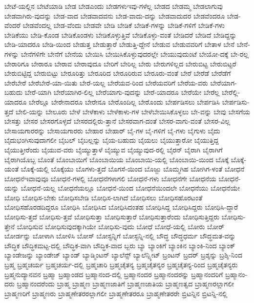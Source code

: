 {ಬೇಟೆ-ಯಲ್ಲಿನ
ಬೇಟೆಯಾಡಿ
ಬೇಡ
ಬೇಡಎಂದು
ಬೇಡಗಳುಇವು-ಗಳೆಲ್ಲ
ಬೇಡದ
ಬೇಡಮ್ಮ
ಬೇಡಲಾಗುವು
ಬೇಡವಾಗಿರು-ವುದನ್ನು
ಬೇಡ-ವಾದ
ಬೇಡವಾದವನು
ಬೇಡ-ವಾದು-ದನ್ನು
ಬೇಡವಾದುದರ
ಬೇಡವೆಂದರೂ
ಬೇಡ-ವೆಂದರೆ
ಬೇಡವೆಂದಲ್ಲ
ಬೇಡ-ವೆಂದು
ಬೇಡವೇ
ಬೇಡಿ
ಬೇಡಿಕೆ
ಬೇಡಿಕೆ-ಗಳನ್ನು
ಬೇಡಿಕೆ-ಗಳಿಗೆ
ಬೇಡಿಕೆ-ಗಳು
ಬೇಡಿಕೆಯು
ಬೇಡಿ-ಕೊಂಡ
ಬೇಡಿಕೊಂಡಳು
ಬೇಡಿಕೊಳ್ಳುತ್ತಿವೆ
ಬೇಡಿಕೊಳ್ಳು-ವಂತೆ
ಬೇಡಿದರೆ
ಬೇಡಿದೆ
ಬೇಡಿದ್ದನ್ನು
ಬೇಡಿ-ಯಾದರೂ
ಬೇಡಿ-ಯಿಂದ
ಬೇಡುತ್ತ
ಬೇಡುತ್ತಾರೆ
ಬೇಡುತ್ತಿ-ದ್ದೇನೆ
ಬೇಡುವ
ಬೇಡುವವರಿಗೆ
ಬೇತಾಳ
ಬೇನೆ
ಬೇನೆ-ಗಳನ್ನು
ಬೇನೆಗಳಿಗೇ
ಬೇನೆಗೆ
ಬೇನೆಯ
ಬೇಯಿಸಿ
ಬೇಯಿಸಿಕೊಳ್ಳುವುದರಲ್ಲೇ
ಬೇಯುವುದುಂಟೆ
ಬೇಯೋ-ದಕ್ಕೆ
ಬೇ-ರಲ್ಲ
ಬೇರಾರಿಗೂ
ಬೇರಾರೂ
ಬೇರಾವ
ಬೇರಾವುದೂ
ಬೇರಿಗೆ
ಬೇರಿಲ್ಲ
ಬೇರು
ಬೇರುಗಳಿಲ್ಲದ
ಬೇರುಬಿಟ್ಟ
ಬೇರುಬಿಟ್ಟರೆ
ಬೇರುಬಿಟ್ಟಿದ್ದ
ಬೇರುಬಿಟ್ಟು
ಬೇರೂರಿತ್ತು
ಬೇರೂರಿದ
ಬೇರೂರಿರುವ
ಬೇರೂರು-ವಂತೆ
ಬೇರೆ
ಬೇರೆಡೆ
ಬೇರೆಡೆಗೆ
ಬೇರೆಬೇರೆ
ಬೇರೆಬೇರೆ-ಯಾ-ಯಿತು
ಬೇರೆ-ಯಲ್ಲ
ಬೇರೆಯವ-ರಿಂದ
ಬೇರೆಯವರಿಗೆ
ಬೇರೆಯ-ವರು
ಬೇರೆಯಾಗ-ಬಹುದು
ಬೇರೆ-ಯಾಗಿ
ಬೇರೆಯಾಗಿರ-ಲಿಲ್ಲ
ಬೇರೆಯಾಗು-ವುದನ್ನು
ಬೇರೆ-ಯಾದರೂ
ಬೇರೆಯೇ
ಬೇರೆಲ್ಲ
ಬೇರೆಲ್ಲಿ-ಯಾದರೂ
ಬೇರೆಲ್ಲೂ
ಬೇರೇನಾದರೂ
ಬೇರೇನೂ
ಬೇರೊಂದಿಲ್ಲ
ಬೇರೊಂದು
ಬೇರ್ಪಡಿಸಲು
ಬೇರ್ಪಡಿಸಿ
ಬೇರ್ಪಡಿಸು-ತ್ತದೆ
ಬೇಲಿ-ಯನ್ನು
ಬೇಲೂರು
ಬೇಳೆ
ಬೇಳೆಕಾಳು
ಬೇಳೆಕಾಳು-ಗಳ
ಬೇಳೆಬೇಯಿಸಿಕೊಳ್ಳಲು
ಬೇ-ವನ್ನು
ಬೇವು
ಬೇಸಗೆಯ
ಬೇಸತ್ತು
ಬೇಸರ
ಬೇಸರಗೊಳ್ಳದೆ
ಬೇಸರದಲ್ಲಿರು-ತ್ತಾನೆ
ಬೇಸರವಾಗ-ದಂತೆ
ಬೇಸರ-ವಾಗು-ವಂತೆ
ಬೇಸರ-ವಿಲ್ಲ
ಬೇಸಾಯಗಾರರನ್ನು
ಬೇಸಾಯಗಾರರು
ಬೇಹಾರ
ಬೇಹಾರ್
ಬೈ-ಗಳ
ಬೈ-ಗಳಿಗೆ
ಬೈ-ಗಳು
ಬೈಗುಳು
ಬೈದು
ಬೈದುಭಂಗಿಸುವುದಾಗಲೀ
ಬೈಬಲ್
ಬೈಬಲ್ಲನ್ನು
ಬೈಯ-ಬಹುದು
ಬೈಯಲು
ಬೈಯುತ್ತಾರೋ
ಬೈಯುತ್ತಿದ್ದ
ಬೈಯುತ್ತೀರೆಂದು
ಬೈಯುವ-ವರು
ಬೈಯ್ಯುತ್ತಾಳೆ
ಬೈಯ್ಯುವ
ಬೈಯ್ಯುವುದ-ರಲ್ಲಿ
ಬೈರನ್
ಬೈರಾಗಿ
ಬೈರಾಗಿಗೆ
ಬೈರಾಗಿಯೊಬ್ಬ
ಬೊಂತೆ
ಬೊಂಬಾಯಿಗೆ
ಬೊಂಬಾಯಿಯ
ಬೊಂಬಾಯಿ-ಯಲ್ಲಿ
ಬೊಂಬಾಯಿ-ಯಿಂದ
ಬೊಕ್ಕೆ
ಬೊಕ್ಕೆ-ಯಂತೆ
ಬೊಕ್ಕೆ-ಯಲ್ಲಿ
ಬೊಕ್ಕೆಯು
ಬೊಗಳು-ತ್ತದೆ
ಬೊಗಸೆ-ಯಿಂದ
ಬೊಜ್ಜು
ಬೊಮ್ಮಗಿಹ
ಬೋಗಿಗ-ಳಂತೆ
ಬೋಧನೆ
ಬೋಧನೆಇವಾವುವೂ
ಬೋಧನೆ-ಗಳಲ್ಲಿ
ಬೋಧನೆಗಳಾಗಲಿ
ಬೋಧನೆ-ಗಳು
ಬೋಧನೆಗೇ
ಬೋಧನೆಯ
ಬೋಧನೆ-ಯನ್ನು
ಬೋಧನೆ-ಯಲ್ಲ
ಬೋಧನೆಯಲ್ಲೂ
ಬೋಧನೆ-ಯಿಂದ
ಬೋಧನೆಯಿಂದಲೇ
ಬೋಧನೆಯು
ಬೋಧನೆಯೇ
ಬೋಧಿ
ಬೋಧಿಸ-ಬೇಕು
ಬೋಧಿಸಬೇಡಿ
ಬೋಧಿಸ-ಲಾಗಿದೆ
ಬೋಧಿಸಲು
ಬೋಧಿಸಹೊರಟಂತೆ
ಬೋಧಿಸಹೊರಡದಿದ್ದರೂ
ಬೋಧಿಸಿ
ಬೋಧಿಸಿದ
ಬೋಧಿಸಿದಂತಹ
ಬೋಧಿಸಿದ್ದ
ಬೋಧಿಸಿದ್ದರು
ಬೋಧಿಸಿ-ದ್ದಾರೆ
ಬೋಧಿಸು-ತ್ತದೆ
ಬೋಧಿಸು-ತ್ತವೆ
ಬೋಧಿಸುತ್ತಾ
ಬೋಧಿಸುತ್ತಾರೆ
ಬೋಧಿಸುತ್ತಾರೆಂದು
ಬೋಧಿಸುತ್ತಿದ್ದರು
ಬೋಧಿಸು-ತ್ತೇನೆ
ಬೋಧಿಸುವ
ಬೋಧಿಸುವುದಕ್ಕಾಗಿಯೇ
ಬೋಧಿಸು-ವುದು
ಬೋಧೆ
ಬೋಧೆ-ಯಲ್ಲಿ
ಬೋರು
ಬೋರ್
ಬೋರ್ಡನ್ನು
ಬೋಳಾಗಿ
ಬೋಳಿಸಿ
ಬೋಸ್
ಬೋಸ್ಟನ್ನಿಗೆ
ಬೋಸ್ಟನ್ನಿ-ನಲ್ಲಿ
ಬೌದ್ಧ
ಬೌದ್ಧಧರ್ಮ
ಬೌದ್ಧಮತ-ವನ್ನು
ಬೌದ್ಧಿಕ
ಬೌದ್ಧಿಕಮಟ್ಟ-ದಲ್ಲಿ
ಬೌದ್ಧಿಕ-ವಾಗಿ
ಬೌದ್ಧಿಕ-ವಾದ
ಬ್ಬರು
ಬ್ಯಾ
ಬ್ಯಾಂಕಿಗೆ
ಬ್ಯಾಂಕಿನ
ಬ್ಯಾಂಕಿ-ನಿಂದ
ಬ್ಯಾಂಕ್
ಬ್ಯಾಂಡೇಜನ್ನು
ಬ್ಯಾಂಡೇಜ್
ಬ್ಯಾಂಡ್
ಬ್ಯಾಡ್ಮಿಂಟನ್
ಬ್ಯಾಲೆನ್ಸ್
ಬ್ಯಾಲೆನ್ಸ್ಶೀಟ್
ಬ್ರಂಟನ್
ಬ್ರದರ್
ಬ್ರಶ್ಶನ್ನು
ಬ್ರಶ್ಶಿ-ನಿಂದ
ಬ್ರಹ್ಮ
ಬ್ರಹ್ಮಚರ್ಯ
ಬ್ರಹ್ಮಚರ್ಯ-ದಲ್ಲಿ
ಬ್ರಹ್ಮಚಾರಿ
ಬ್ರಹ್ಮಚೈತನ್ಯ
ಬ್ರಹ್ಮಚೈತನ್ಯರ
ಬ್ರಹ್ಮಚೈತನ್ಯ-ರಿಂದ
ಬ್ರಹ್ಮಚೈತನ್ಯರು
ಬ್ರಹ್ಮನುದ್ಯಾನವನ
ಬ್ರಹ್ಮಾ
ಬ್ರಹ್ಮಾಂಡದ
ಬ್ರಹ್ಮಾನಂದ-ದಲ್ಲಿ
ಬ್ರಹ್ಮಾನಂದರ
ಬ್ರಹ್ಮಾನಂದರನ್ನು
ಬ್ರಹ್ಮಾನಂದರಿಗೆ
ಬ್ರಹ್ಮಾನಂ-ದರು
ಬ್ರಹ್ಮಾನಂದರೆಂದು
ಬ್ರಾಹ್ಮ
ಬ್ರಾಹ್ಮಣ
ಬ್ರಾಹ್ಮಣಜಾತಿಗೆ
ಬ್ರಾಹ್ಮಣಜಾತಿಯ
ಬ್ರಾಹ್ಮಣತ್ವದ
ಬ್ರಾಹ್ಮಣರಲ್ಲಾಗಲೀ
ಬ್ರಾಹ್ಮಣರಿಗೆ
ಬ್ರಾಹ್ಮಣರು
ಬ್ರಾಹ್ಮಣೇತರರಲ್ಲಾಗಲೀ
ಬ್ರಾಹ್ಮಣೇತರರೂ
ಬ್ರಾಹ್ಮಣೇತರರೇ
ಬ್ರಿಟನ್ನಿನ
ಬ್ರಿಟನ್ನಿ-ನಲ್ಲಿ
}
